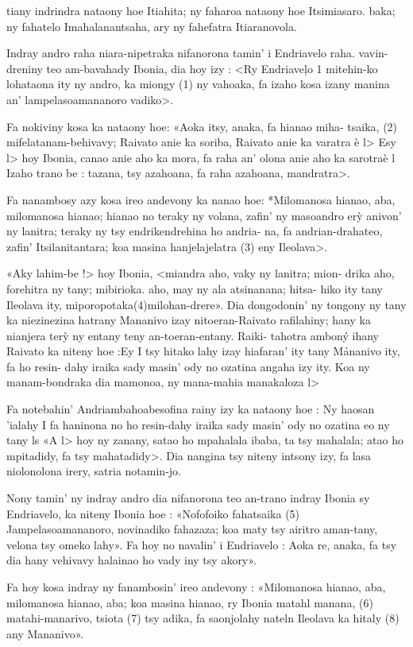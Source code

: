tiany indrindra nataony hoe Itiahita; ny faharoa nataony hoe Itsimiasaro.
baka; ny fahatelo Imahalanantsaha, ary ny fahefatra Itiaranovola.

Indray andro raha niara-nipetraka nifanorona tamin' i Endriavelo raha.
vavin-dreniny teo am-bavahady Ibonia, dia hoy izy : <Ry Endriaveļo 1
mitehin-ko lohataona ity ny andro, ka miongy (1) ny vahoaka, fa izaho kosa
izany manina an' lampelasoamananoro vadiko>.

Fa nokiviny kosa ka nataony hoe: «Aoka itsy, anaka, fa hianao miha-
tsaika, (2) mifelatanam-behivavy; Raivato anie ka soriba, Raivato anie
ka varatra è l> Esy l> hoy Ibonia, canao anie aho ka mora, fa raha an'
olona anie aho ka sarotraè l Izaho trano be : tazana, tsy azahoana, fa raha
azahoana, mandratra>.

Fa nanambosy azy kosa ireo andevony ka nanao hoe: *Milomanosa
hianao, aba, milomanosa hianao; hianao no teraky ny volana, zafin' ny
masoandro erỳ anivon' ny lanitra; teraky ny tsy endrikendrehina ho andria-
na, fa andrian-drahateo, zafin' Itsilanitantara; koa masina hanjelajelatra (3)
eny Ileolava>.

«Aky lahim-be !> hoy Ibonia, <miandra aho, vaky ny lanitra; mion-
drika aho, forehitra ny tany; mibirioka. aho, may ny ala atsinanana; hitsa-
hiko ity tany Ileolava ity, miporopotaka(4)milohan-drere». Dia dongodonin'
ny tongony ny tany ka niezinezina hatrany Mananivo izay nitoeran-Raivato
rafilahiny; hany ka nianjera terỳ ny entany teny an-toeran-entany. Raiki-
tahotra amboný ihany Raivato ka niteny hoe :Ey I tsy hitako lahy izay
hiafaran' ity tany Mảnanivo ity, fa ho resin- dahy iraika sady masin' ody
no ozatina angaha izy ity. Koa ny manam-bondraka dia mamonoa, ny
mana-mahia manakaloza l>

Fa notebahin' Andriambahoabesofina rainy izy ka nataony hoe : Ny
haosan 'ialahy I fa haninona no ho resin-dahy iraika sady masin' ody no
ozatina eo ny tany ls «A l> hoy ny zanany, satao ho mpahalala ibaba, ta
tsy mahalala; atao ho mpitadidy, fa tsy mahatadidy>. Dia nangina tsy
niteny intsony izy, fa lasa niolonolona irery, satria notamin-jo.

Nony tamin' ny indray andro dia nifanorona teo an-trano indray
Ibonia sy Endriavelo, ka niteny Ibonia hoe : «Nofofoiko fahatsaika (5)
Jampelasoamananoro, novinadiko fahazaza; koa maty tsy airitro aman-tany,
velona tsy omeko lahy». Fa hoy no navalin' i Endriavelo : Aoka re, anaka,
fa tsy dia hany vehivavy halainao ho vady iny tsy akory».

Fa hoy kosa indray ny fanambosin' ireo andevony : «Milomanosa
hianao, aba, milomanosa hianao, aba; koa masina hianao, ry Ibonia matahl
manana, (6) matahi-manarivo, tsiota (7) tsy adika, fa saonjolahy nateln
Ileolava ka hitaly (8) any Mananivo».

